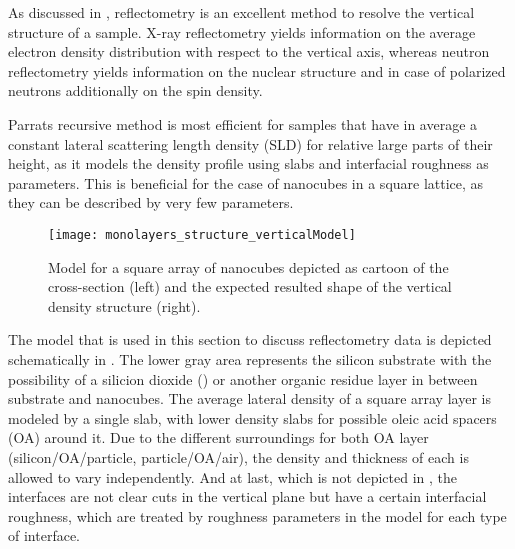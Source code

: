 \documentclass[\main/dresen_thesis.tex]{subfiles}
\begin{document}
  As discussed in , reflectometry is an excellent method to resolve the vertical structure of a sample.
  X-ray reflectometry yields information on the average electron density distribution with respect to the vertical axis, whereas neutron reflectometry yields information on the nuclear structure and in case of polarized neutrons additionally on the spin density.

  Parrats recursive method is most efficient for samples that have in average a constant lateral scattering length density (SLD) for relative large parts of their height, as it models the density profile using slabs and interfacial roughness as parameters.
  This is beneficial for the case of nanocubes in a square lattice, as they can be described by very few parameters.

  \begin{figure}[tb]
    \centering
    \texttt{[image: monolayers\_structure\_verticalModel]}
    \caption{\label{fig:monolayers:structure:verticalModel}Model for a square array of nanocubes depicted as cartoon of the cross-section (left) and the expected resulted shape of the vertical density structure (right).}
  \end{figure}

  The model that is used in this section to discuss reflectometry data is depicted schematically in .
  The lower gray area represents the silicon substrate with the possibility of a silicion dioxide () or another organic residue layer in between substrate and nanocubes.
  The average lateral density of a square array layer is modeled by a single slab, with lower density slabs for possible oleic acid spacers (OA) around it.
  Due to the different surroundings for both OA layer (silicon/OA/particle, particle/OA/air), the density and thickness of each is allowed to vary independently.
  And at last, which is not depicted in , the interfaces are not clear cuts in the vertical plane but have a certain interfacial roughness, which are treated by roughness parameters in the model for each type of interface.
\end{document}
